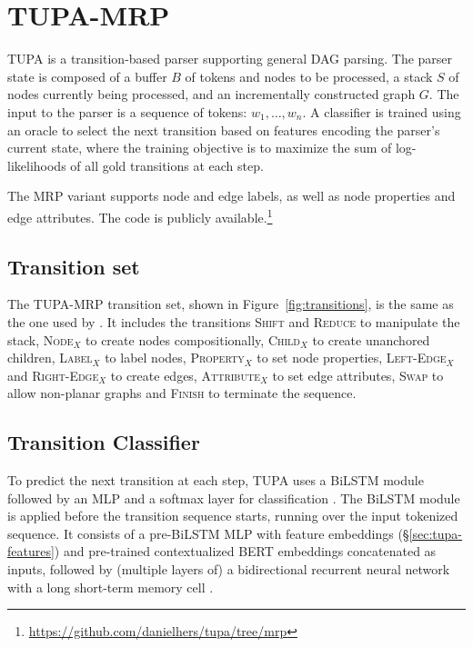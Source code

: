 \documentclass[11pt,a4paper]{article}
\begin{document}
\section{TUPA-MRP}\label{sec:tupa}
TUPA \cite{hershcovich2017a} is a transition-based parser supporting general DAG parsing. The parser state is composed of a buffer $B$ of tokens and nodes to be processed, a stack $S$ of nodes currently being processed, and an incrementally constructed graph $G$. The input to the parser is a sequence of tokens: $w_1, \ldots, w_n$. A classifier is trained using an oracle to select the next transition based on features encoding the parser's current state, where the training objective is to maximize the sum of log-likelihoods of all gold transitions at each step.

The MRP variant \cite{hershcovich-arviv-2019-tupa}
supports node and edge labels, as well as node properties
and edge attributes. The code is publicly available.\footnote{\url{https://github.com/danielhers/tupa/tree/mrp}}

\subsection{Transition set}\label{sec:tupa-transitions}

The TUPA-MRP transition set, shown in Figure~\ref{fig:transitions}, is the same as the one
used by .
It includes the transitions \textsc{Shift} and \textsc{Reduce} to manipulate the stack, \textsc{Node$_X$} to create nodes compositionally, \textsc{Child$_X$} to create unanchored children, \textsc{Label$_X$} to label nodes, \textsc{Property$_X$} to set node properties, \textsc{Left-Edge$_X$} and \textsc{Right-Edge$_X$} to create edges, \textsc{Attribute$_X$} to set edge attributes, \textsc{Swap} to allow non-planar graphs and \textsc{Finish} to terminate the sequence.

\subsection{Transition Classifier}\label{sec:tupa-classifier}

To predict the next transition at each step, TUPA uses a BiLSTM module followed by an MLP and a softmax layer for classification \cite{kiperwasser2016simple}. The BiLSTM module is applied before the transition sequence starts, running over the input tokenized sequence. It consists of a pre-BiLSTM MLP with feature embeddings (\S\ref{sec:tupa-features}) and pre-trained contextualized BERT \cite{devlin-etal-2019-bert} embeddings concatenated as inputs,
followed by (multiple layers of) a bidirectional recurrent neural network \cite{schuster1997bidirectional,graves2008supervised} with a long short-term memory cell \cite{hochreiter1997long}.
\end{document}
